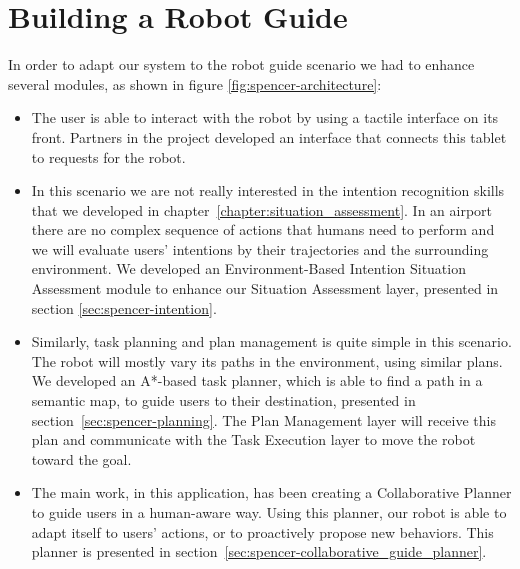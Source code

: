 \section{Building a Robot Guide}
\label{sec:spencer-robot_guide}
In order to adapt our system to the robot guide scenario we had to enhance several modules, as shown in figure \ref{fig:spencer-architecture}: 
\begin{itemize}
\item The user is able to interact with the robot by using a tactile interface on its front. Partners in the project developed an interface that connects this tablet to requests for the robot.
\item In this scenario we are not really interested in the intention recognition skills that we developed in chapter~\ref{chapter:situation_assessment}. In an airport there are no complex sequence of actions that humans need to perform and we will evaluate users' intentions by their trajectories and the surrounding environment. We developed an Environment-Based Intention Situation Assessment module to enhance our Situation Assessment layer, presented in section \ref{sec:spencer-intention}.  
\item Similarly, task planning and plan management is quite simple in this scenario. The robot will mostly vary its paths in the environment, using similar plans. We developed an A*-based task planner, which is able to find a path in a semantic map, to guide users to their destination, presented in section~\ref{sec:spencer-planning}. The Plan Management layer will receive this plan and communicate with the Task Execution layer to move the robot toward the goal.
\item The main work, in this application, has been creating a Collaborative Planner to guide users in a human-aware way. Using this planner, our robot is able to adapt itself to users' actions, or to proactively propose new behaviors. This planner is presented in section~\ref{sec:spencer-collaborative_guide_planner}.
\end{itemize} 

